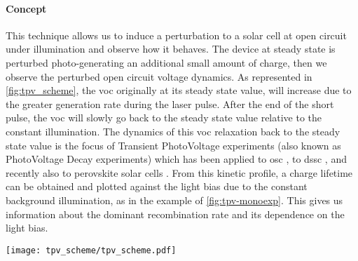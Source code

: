 	\paragraph{Concept}
	This technique allows us to induce a perturbation to a solar cell at open circuit under illumination and observe how it behaves.
	The device at steady state is perturbed photo\hyp{}generating an additional small amount of charge, then we observe the perturbed open circuit voltage dynamics.
	As represented in \cref{fig:tpv_scheme}, the \gls{voc} originally at its steady state value, will increase due to the greater generation rate during the laser pulse.
	After the end of the short pulse, the \gls{voc} will slowly go back to the steady state value relative to the constant illumination.
	The dynamics of this \gls{voc} relaxation back to the steady state value is the focus of Transient PhotoVoltage experiments (also known as PhotoVoltage Decay experiments) which has been applied to \gls{osc} \cite{Shuttle2008}, to \gls{dssc} \cite{ORegan2005,ORegan2004,ORegan2006}, and recently also to perovskite solar cells \cite{Roiati2014a,Marin-Beloqui2014}.
	From this kinetic profile, a charge lifetime can be obtained and plotted against the light bias due to the constant background illumination, as in the example of \cref{fig:tpv-monoexp}.
	This gives us information about the dominant recombination rate and its dependence on the light bias.

	\begin{SCfigure}
		\centering
		\texttt{[image: tpv\_scheme/tpv\_scheme.pdf]}
		\label{fig:tpv_scheme}
	\end{SCfigure}

